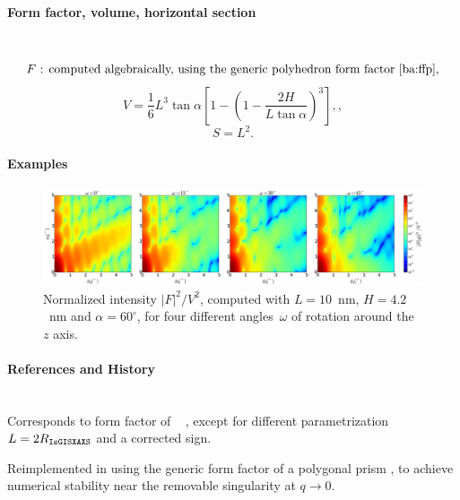 \paragraph{Form factor, volume, horizontal section}\strut\\
\begin{equation*}
  F \text{~: computed algebraically,
          using the generic polyhedron form factor~\cite{ba:ffp},}
\end{equation*}
\begin{equation*}
  V = \dfrac{1}{6}  L^3 \tan\alpha\left[ 1
             - \left(1 - \dfrac{2H}{L\tan\alpha}\right)^3 \right],,
\end{equation*}
\begin{equation*}
  S = L^2.
\end{equation*}

\paragraph{Examples}\strut

\begin{figure}[H]
\begin{center}
\includegraphics[width=\textwidth]{fig/ff2/ff_Pyramid.pdf}
\end{center}
\caption{Normalized intensity $|F|^2/V^2$,
computed with $L=10$~nm, $H=4.2$~nm and $\alpha=60^{\circ}$,
for four different angles~$\omega$ of rotation around the $z$ axis.}
\end{figure}

\paragraph{References and History}\strut\\
Corresponds to  form factor of \IsGISAXS\
\cite[Eq.~2.31]{Laz08} \cite[Eq.~221]{ReLL09},
except for different parametrization $L=2R_{\rm{\texttt{IsGISXAXS}}}$
and a corrected sign.

Reimplemented in  using the generic form factor
of a polygonal prism \cite{ba:ffp},
to achieve numerical stability near the removable singularity at $q\to0$.


